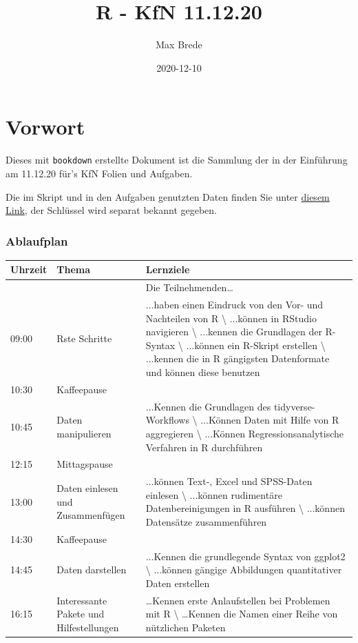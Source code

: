 \documentclass[
]{book}
\title{R - KfN 11.12.20}
\author{Max Brede}
\date{2020-12-10}
\begin{document}
\maketitle

{
\setcounter{tocdepth}{1}
\tableofcontents
}
\hypertarget{vorwort}{%
\chapter{Vorwort}\label{vorwort}}

Dieses mit \texttt{bookdown} erstellte Dokument ist die Sammlung der in der Einführung am 11.12.20 für's KfN Folien und Aufgaben.

Die im Skript und in den Aufgaben genutzten Daten finden Sie unter \href{https://mega.nz/folder/k2A0WZAZ}{diesem Link}, der Schlüssel wird separat bekannt gegeben.

\hypertarget{ablaufplan}{%
\subsection{Ablaufplan}\label{ablaufplan}}

\begin{tabular}{l|l|l}
\hline
Uhrzeit & Thema & Lernziele\\
\hline
 &  & Die Teilnehmenden…\\
\hline
09:00 & Rste Schritte & ...haben einen Eindruck von den Vor- und Nachteilen von R \textbackslash{}
 ...können in RStudio navigieren \textbackslash{}
 ...kennen die Grundlagen der R-Syntax \textbackslash{}
 ...können ein R-Skript erstellen \textbackslash{}
 ...kennen die in R gängigsten Datenformate und können diese benutzen\\
\hline
10:30 & Kaffeepause & \\
\hline
10:45 & Daten manipulieren & ...Kennen die Grundlagen des tidyverse-Workflows \textbackslash{}
 ...Können Daten mit Hilfe von R aggregieren \textbackslash{}
 ...Können Regressionsanalytische Verfahren in R durchführen\\
\hline
12:15 & Mittagspause & \\
\hline
13:00 & Daten einlesen und Zusammenfügen & ...können Text-, Excel und SPSS-Daten einlesen \textbackslash{}
 ...können rudimentäre Datenbereinigungen in R ausführen \textbackslash{}
 ...können Datensätze zusammenführen\\
\hline
14:30 & Kaffeepause & \\
\hline
14:45 & Daten darstellen & ...Kennen die grundlegende Syntax von ggplot2 \textbackslash{}
 ...können gängige Abbildungen quantitativer Daten erstellen\\
\hline
16:15 & Interessante Pakete und Hilfestellungen & …Kennen erste Anlaufstellen bei Problemen mit R \textbackslash{}
 …Kennen die Namen einer Reihe von nützlichen Paketen\\
\hline
\end{tabular}
\end{document}
